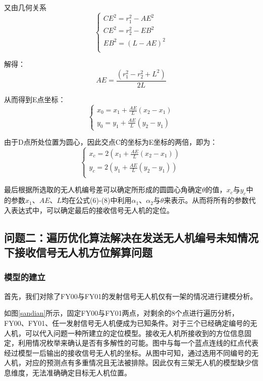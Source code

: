 \documentclass{my_paper}
\begin{document}
又由几何关系
\begin{equation}
    \begin{cases}
        CE ^{2} = r_1 ^{2} - AE ^{2} \\
        CE ^{2} = r_2^{2} - EB ^{2}  \\
        EB ^{2} = (L - AE) ^{2}      \\
    \end{cases}
\end{equation}

解得：
\begin{equation*}
    AE = \frac{(r_1 ^2 - r_2 ^2 + L ^2)}{2L}
\end{equation*}

从而得到E点坐标：
\begin{equation}
    \begin{cases}
        x_0 = x_1 + \frac{AE}{L} (x_2 - x_1) \\
        y_0 = y_1 + \frac{AE}{L} (y_2 - y_1)
    \end{cases}
\end{equation}

由于D点所处位置为圆心，因此交点C的坐标为E坐标的两倍，即为：
\begin{equation}
    \begin{cases}
        x_c = 2(x_1 + \frac{AE}{L} (x_2 - x_1)) \\
        y_c = 2(y_1 + \frac{AE}{L} (y_2 - y_1)) \\
    \end{cases}
\end{equation}



最后根据所选取的无人机编号差可以确定所形成的圆圆心角确定$\theta$的值，$x_c$与$y_c$中的参数$x_1$、$AE$、$L$均在公式(6)-(8)中利用$\alpha_1$、$\alpha_2$与$\theta$来表示。从而将所有的参数代入表达式中，可以确定最后的接收信号无人机的定位。

\subsection{问题二：遍历优化算法解决在发送无人机编号未知情况下接收信号无人机方位解算问题}
\subsubsection{模型的建立}
首先，我们对除了FY00与FY01的发射信号无人机仅有一架的情况进行建模分析。

如图\ref{sandian}所示，固定FY00与FY01两点，对剩余的8个点进行遍历分析，FY00、FY01、任一发射信号无人机便成为已知条件。对于三个已经确定编号的无人机，可以代入问题一种所建立的定位模型。接收无人机所接收到的方位信息固定，利用情况枚举来确认是否有多解性的可能。图中与每一个蓝点连线的红点代表经过模型一后输出的接收信号无人机的坐标。从图中可知，通过选用不同编号的无人机，对应的预测点有多重情况且无法被排除。因此仅有三架无人机的模型缺少信息维度，无法准确确定目标无人机位置。
\end{document}
